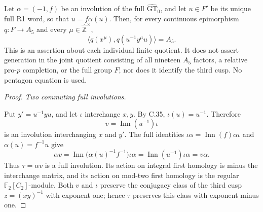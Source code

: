 Let \(\alpha=(-1,f)\) be an involution of the full
\(\widehat{\mathrm{GT}}_0\), and let \(u\in F'\) be its
unique full R1 word, so that \(u=f\alpha(u)\). Then, for
every continuous epimorphism \(q:F\to A_5\) and every
\(\mu\in\widehat{\mathbb Z}^{\times}\),
\[
 \bigl\langle q(x^\mu),q(u^{-1}y^\mu u)\bigr\rangle=A_5.
 \tag{C.37.1}
\]
This is an assertion about each individual finite quotient. It does
not assert generation in the joint quotient consisting of all
nineteen \(A_5\) factors, a relative pro-\(p\) completion,
or the full group \(F\); nor does it identify the third cusp.
No pentagon equation is used.

\begin{proof}
\emph{Two commuting full involutions.}\par
Put \(y'=u^{-1}yu\), and let \(\iota\) interchange
\(x,y\). By C.35, \(\iota(u)=u^{-1}\). Therefore
\[
             v=\operatorname{Inn}(u^{-1})\iota
\]
is an involution interchanging \(x\) and \(y'\).
The full identities
\(\iota\alpha=\operatorname{Inn}(f)\alpha\iota\)
and \(\alpha(u)=f^{-1}u\) give
\[
 \alpha v
 =\operatorname{Inn}\bigl(\alpha(u)^{-1}f^{-1}\bigr)
       \iota\alpha
 =\operatorname{Inn}(u^{-1})\iota\alpha=v\alpha.
 \tag{C.37.2}
\]
Thus \(\tau=\alpha v\) is a full involution. Its action on
integral first homology is minus the interchange matrix, and its
action on mod-two first homology is the regular
\(\mathbb F_2[C_2]\)-module. Both \(v\) and \(\iota\)
preserve the conjugacy class of the third cusp
\(z=(xy)^{-1}\) with exponent one; hence \(\tau\)
preserves this class with exponent minus one.


\end{proof}
